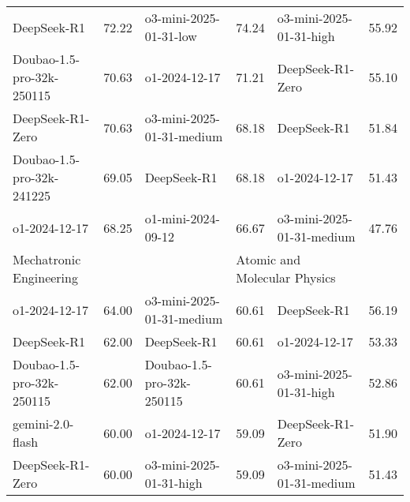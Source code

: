 {\begin{longtable}{p{4.2cm}>{\centering\arraybackslash} p{0.8cm}|p{4.2cm} >{\centering\arraybackslash} p{0.8cm}|p{4.2cm} >{\centering\arraybackslash} p{0.8cm}}
\hline
\cellcolor{blue!5} DeepSeek-R1 & \cellcolor{blue!2}72.22 & \cellcolor{yellow!5} o3-mini-2025-01-31-low & \cellcolor{yellow!2} 74.24 & \cellcolor{green!5} o3-mini-2025-01-31-high & \cellcolor{green!2} 55.92\\
\cellcolor{blue!5} Doubao-1.5-pro-32k-250115 & \cellcolor{blue!2}70.63 & \cellcolor{yellow!5} o1-2024-12-17 & \cellcolor{yellow!2} 71.21 & \cellcolor{green!5} DeepSeek-R1-Zero & \cellcolor{green!2} 55.10\\
\cellcolor{blue!5} DeepSeek-R1-Zero & \cellcolor{blue!2}70.63 & \cellcolor{yellow!5} o3-mini-2025-01-31-medium & \cellcolor{yellow!2} 68.18 & \cellcolor{green!5} DeepSeek-R1 & \cellcolor{green!2} 51.84\\
\cellcolor{blue!5} Doubao-1.5-pro-32k-241225 & \cellcolor{blue!2}69.05 & \cellcolor{yellow!5} DeepSeek-R1 & \cellcolor{yellow!2} 68.18 & \cellcolor{green!5} o1-2024-12-17 & \cellcolor{green!2} 51.43\\
\cellcolor{blue!5} o1-2024-12-17 & \cellcolor{blue!2}68.25 & \cellcolor{yellow!5} o1-mini-2024-09-12 & \cellcolor{yellow!2} 66.67 & \cellcolor{green!5} o3-mini-2025-01-31-medium & \cellcolor{green!2} 47.76\\
\hline
\multicolumn{2}{p{5.15cm}|}{\cellcolor{blue!10} \centering Mechatronic Engineering} & \multicolumn{2}{p{5.15cm}|}{\cellcolor{yellow!10} \centering Emergency Medicine} & \multicolumn{2}{p{5.15cm}}{\cellcolor{green!10} \centering Atomic and Molecular Physics}\\
\hline
\cellcolor{blue!5} o1-2024-12-17 & \cellcolor{blue!2}64.00 & \cellcolor{yellow!5} o3-mini-2025-01-31-medium & \cellcolor{yellow!2} 60.61 & \cellcolor{green!5} DeepSeek-R1 & \cellcolor{green!2} 56.19\\
\cellcolor{blue!5} DeepSeek-R1 & \cellcolor{blue!2}62.00 & \cellcolor{yellow!5} DeepSeek-R1 & \cellcolor{yellow!2} 60.61 & \cellcolor{green!5} o1-2024-12-17 & \cellcolor{green!2} 53.33\\
\cellcolor{blue!5} Doubao-1.5-pro-32k-250115 & \cellcolor{blue!2}62.00 & \cellcolor{yellow!5} Doubao-1.5-pro-32k-250115 & \cellcolor{yellow!2} 60.61 & \cellcolor{green!5} o3-mini-2025-01-31-high & \cellcolor{green!2} 52.86\\
\cellcolor{blue!5} gemini-2.0-flash & \cellcolor{blue!2}60.00 & \cellcolor{yellow!5} o1-2024-12-17 & \cellcolor{yellow!2} 59.09 & \cellcolor{green!5} DeepSeek-R1-Zero & \cellcolor{green!2} 51.90\\
\cellcolor{blue!5} DeepSeek-R1-Zero & \cellcolor{blue!2}60.00 & \cellcolor{yellow!5} o3-mini-2025-01-31-high & \cellcolor{yellow!2} 59.09 & \cellcolor{green!5} o3-mini-2025-01-31-medium & \cellcolor{green!2} 51.43\\

\end{longtable}}
